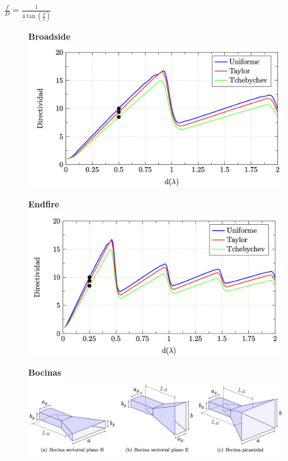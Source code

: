 \documentclass[twocolumn, 8pt]{extarticle}
\begin{document}
\vspace{0.5cm}
\( \frac{f}{D} = \frac{1}{4\tan\left(\frac{\beta}{2}\right)} \)

\newpage

\begin{multicols}{2}
    \begin{figure}[H]
        \centering
        \textbf{Broadside}
        \includegraphics[width=\columnwidth]{directividad_broadside.png}
    \end{figure}

    \begin{figure}[H]
        \centering
        \textbf{Endfire}
        \includegraphics[width=\columnwidth]{directividad_endfire.png}
    \end{figure}
\end{multicols}

\begin{figure}[H]
    \centering
    \textbf{Bocinas}
    \centering
    \includegraphics[width=\columnwidth]{bocinas.png}
\end{figure}
\end{document}
